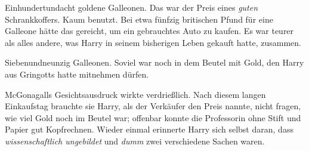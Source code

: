 Einhundertundacht goldene Galleonen. Das war der Preis eines \emph{guten} Schrankkoffers. Kaum benutzt. Bei etwa fünfzig britischen Pfund für eine Galleone hätte das gereicht, um ein gebrauchtes Auto zu kaufen. Es war teurer als alles andere, was Harry in seinem bisherigen Leben gekauft hatte, zusammen.

Siebenundneunzig Galleonen. Soviel war noch in dem Beutel mit Gold, den Harry aus Gringotts hatte mitnehmen dürfen.

McGonagalls Gesichtsausdruck wirkte verdrießlich. Nach diesem langen Einkaufstag brauchte sie Harry, als der Verkäufer den Preis nannte, nicht fragen, wie viel Gold noch im Beutel war; offenbar konnte die Professorin ohne Stift und Papier gut Kopfrechnen. Wieder einmal erinnerte Harry sich selbst daran, dass \emph{wissenschaftlich ungebildet} und \emph{dumm} zwei verschiedene Sachen waren.

